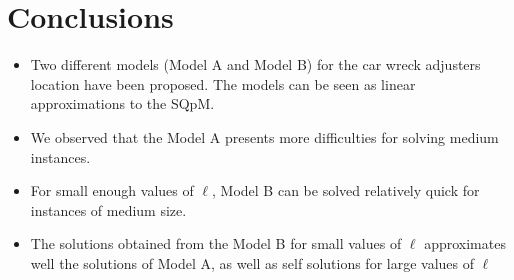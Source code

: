 \chapter{Conclusions}
\begin{itemize}
\item Two different models (Model A and Model B)
  for the car wreck adjusters location have been proposed. 
  The models can be seen as linear approximations to the SQpM.
\item We observed that the Model A
  presents more difficulties for solving medium instances.
\item For small enough values of $\ell$,
  Model B can be solved relatively quick
  for instances of medium size.
\item The solutions obtained from the Model B
  for small values of $\ell$
  approximates well the solutions of Model A,
  as well as self solutions for large values of $\ell$
\end{itemize}
